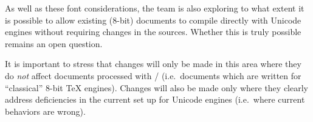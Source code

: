 \documentclass{ltnews}
\begin{document}
As well as these font considerations, the team is also exploring
to what extent it is possible to allow existing ($8$-bit)
documents to compile directly with Unicode engines without requiring
changes in the sources. Whether this is truly possible remains an open
question.

It is important to stress that changes will only be made in this area where
they do \emph{not} affect documents processed with
/ (i.e.~documents which are written for
``classical'' $8$-bit \TeX{} engines). Changes will also be made only where
they clearly address deficiencies in the current set up for Unicode engines
(i.e.~where current behaviors are wrong).
\end{document}
